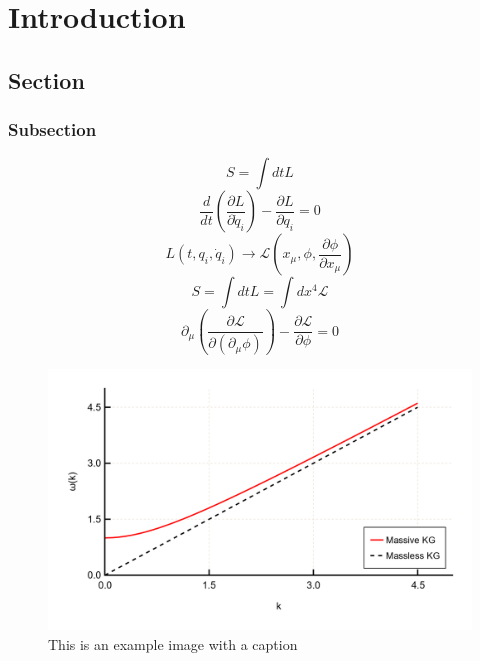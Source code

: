 
\chapter{Introduction}
\label{chapter:introduction}

\section{Section}


\lipsum[2]

\subsection{Subsection}

\lipsum[1]


%
\begin{equation}
S   = \int dt L
\end{equation}
%
\lipsum[3] 
%
\begin{equation}
\frac{d}{dt} \left( \frac{\partial L}{\partial \dot{q}_i} \right) - \frac{\partial L}{\partial q_i} = 0
\end{equation}
%
\lipsum[3]
\begin{equation}
L(t,q_i , \dot{q}_i) \rightarrow \mathcal{L}\left(x_\mu , \phi , \frac{\partial \phi}{\partial x_\mu} \right)
\end{equation}
%
\lipsum[3]
%
\begin{equation}
S = \int dt L = \int dx^4 \mathcal{L}	
\end{equation}
%
\lipsum[4]
%
\begin{equation}
\partial_\mu \left( \frac{\partial \mathcal{L}}{\partial (\partial_\mu \phi)}\right) - \frac{\partial \mathcal{L}}{\partial \phi} = 0
\end{equation}
%


\begin{figure}[ht!]
	\centering
	\includegraphics[width=0.8\linewidth]{figures/klein_gordon_DR}
	\caption[Example figure 1]{ This is an example image with a caption }
	\label{fig:phasediagram_fluid}
\end{figure}





